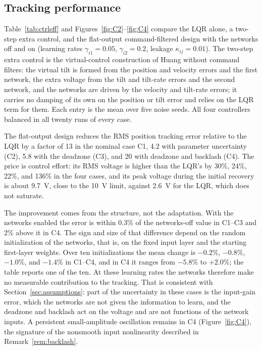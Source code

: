 \subsection{Tracking performance}

Table~\ref{tab:ctrleff} and Figures~\ref{fig:C2}--\ref{fig:C4} compare the
LQR alone, a two-step extra control, and the flat-output command-filtered
design with the networks off and on (learning rates $\gamma_{i1}=0.05$,
$\gamma_{i2}=0.2$, leakage $\kappa_{ij}=0.01$). The two-step extra control is
the virtual-control construction of Huang \cite{huang2002lyapunov} without
command filters: the virtual tilt is formed from the position and velocity
errors and the first network, the extra voltage from the tilt and tilt-rate
errors and the second network, and the networks are driven by the velocity and
tilt-rate errors; it carries no damping of its own on the position or tilt
error and relies on the LQR term for them. Each entry is the mean over five
noise seeds. All four controllers balanced in all twenty runs of every case.

The flat-output design reduces the RMS position tracking error relative to the
LQR by a factor of 13 in the nominal case C1, 4.2 with parameter uncertainty
(C2), 5.8 with the deadzone (C3), and 20 with deadzone and backlash (C4). The
price is control effort: its RMS voltage is higher than the LQR's by 30\%, 24\%,
22\%, and 136\% in the four cases, and its peak voltage during the initial
recovery is about \SI{9.7}{V}, close to the \SI{10}{V} limit, against
\SI{2.6}{V} for the LQR, which does not saturate.

The improvement comes from the structure, not the adaptation. With the
networks enabled the error is within 0.3\% of the networks-off value in C1--C3
and 2\% above it in C4. The sign and size of that difference depend on the
random initialization of the networks, that is, on the fixed input layer and
the starting first-layer weights. Over ten initializations the mean change is
$-0.2\%$, $-0.8\%$, $-1.0\%$, and $-1.4\%$ in C1--C4, and in C4 it ranges from
$-5.8\%$ to $+2.0\%$; the table reports one of the ten. At these learning rates
the networks therefore make no measurable contribution to the tracking. That is
consistent with Section~\ref{sec:assumptions}: part of the uncertainty in these
cases is the input-gain error, which the networks are not given the information
to learn, and the deadzone and backlash act on the voltage and are not functions
of the network inputs. A persistent
small-amplitude oscillation remains in C4 (Figure~\ref{fig:C4}), the signature
of the nonsmooth input nonlinearity described in Remark~\ref{rem:backlash}.

